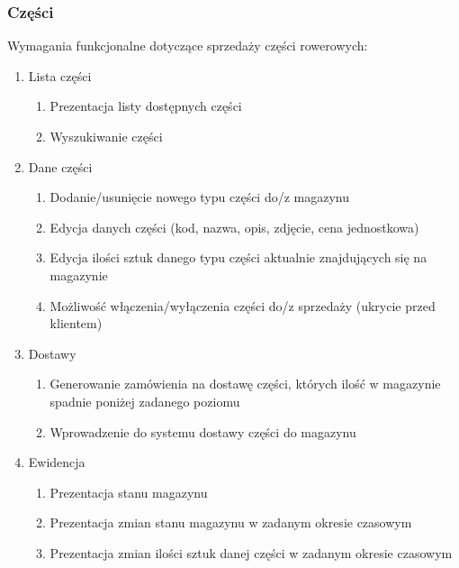 \subsubsection{Części}

Wymagania funkcjonalne dotyczące sprzedaży części rowerowych:

\begin{enumerate}
  \item Lista części
  \begin{enumerate}
	  \item Prezentacja listy dostępnych części
	  \item Wyszukiwanie części
  \end{enumerate}
  \item Dane części
  \begin{enumerate}
	  \item Dodanie/usunięcie nowego typu części do/z magazynu
	  \item Edycja danych części (kod, nazwa, opis, zdjęcie, cena jednostkowa)
	  \item Edycja ilości sztuk danego typu części aktualnie znajdujących się na magazynie
	  \item Możliwość włączenia/wyłączenia części do/z sprzedaży (ukrycie przed klientem)
  \end{enumerate}
  \item Dostawy
  \begin{enumerate}
    \item Generowanie zamówienia na dostawę części, których ilość w magazynie spadnie poniżej zadanego poziomu
    \item Wprowadzenie do systemu dostawy części do magazynu
  \end{enumerate}
  \item Ewidencja
  \begin{enumerate}
    \item Prezentacja stanu magazynu
    \item Prezentacja zmian stanu magazynu w zadanym okresie czasowym
    \item Prezentacja zmian ilości sztuk danej części w zadanym okresie czasowym
  \end{enumerate}
\end{enumerate}